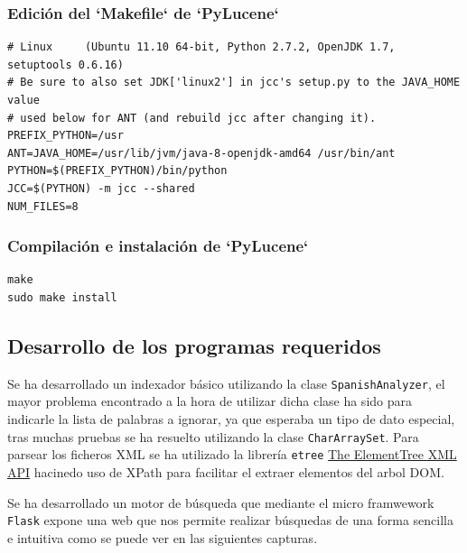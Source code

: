 \subsubsection{Edición del `Makefile` de `PyLucene`}
\begin{lstlisting}
# Linux     (Ubuntu 11.10 64-bit, Python 2.7.2, OpenJDK 1.7, setuptools 0.6.16)
# Be sure to also set JDK['linux2'] in jcc's setup.py to the JAVA_HOME value
# used below for ANT (and rebuild jcc after changing it).
PREFIX_PYTHON=/usr
ANT=JAVA_HOME=/usr/lib/jvm/java-8-openjdk-amd64 /usr/bin/ant
PYTHON=$(PREFIX_PYTHON)/bin/python
JCC=$(PYTHON) -m jcc --shared
NUM_FILES=8
\end{lstlisting}

\subsubsection{Compilación e instalación de `PyLucene`}
\begin{lstlisting}
make
sudo make install
\end{lstlisting}


\subsection{Desarrollo de los programas requeridos}

Se ha desarrollado un indexador básico utilizando la clase
\texttt{SpanishAnalyzer}, el mayor problema encontrado a la hora de
utilizar dicha clase ha sido para indicarle la lista de palabras a
ignorar, ya que esperaba un tipo de dato especial, tras muchas pruebas se ha resuelto utilizando la clase \texttt{CharArraySet}. Para parsear los ficheros XML se ha utilizado la librería \texttt{etree} \href{https://docs.python.org/2/library/xml.etree.elementtree.html}{The ElementTree XML API} hacinedo uso de XPath para facilitar el extraer elementos del arbol DOM.

Se ha desarrollado un motor de búsqueda que mediante el micro framwework \texttt{Flask} expone una web que nos permite realizar búsquedas de una forma sencilla e intuitiva como se puede ver en las siguientes capturas.


